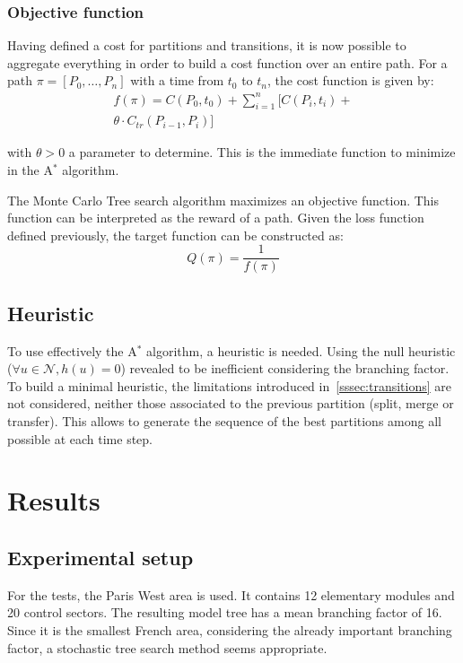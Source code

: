 \documentclass[oneside,twocolumn]{article}
\begin{document}
\subsubsection{Objective function}

Having defined a cost for partitions and transitions, it is now possible to
aggregate everything in order to build a cost function over an entire
path. For a path $\pi = [P_0, \dots, P_n]$ with a time from $t_0$ to $t_n$,
the cost function is given by:
\begin{equation}
  \begin{split}
    f(\pi) = C(P_0, t_0) + \sum_{i = 1}^{n} [C(P_i, t_i) +\\
    \theta \cdot C_{tr}(P_{i-1}, P_i)]
  \end{split}
\end{equation}

with $\theta > 0$ a parameter to determine.
This is the immediate function to minimize in the A$^*$ algorithm.

The Monte Carlo Tree search algorithm maximizes an objective function. This function
can be interpreted as the reward of a path.
Given the loss function defined previously, the target function can be
constructed as:
\begin{equation}
  Q(\pi) = \frac{1}{f(\pi)}
\end{equation}


\subsection{Heuristic}
To use effectively the A\(^*\) algorithm, a heuristic is needed. Using the null
heuristic (\(\forall u \in \mathcal{N}, h(u) = 0\)) revealed to be inefficient
considering the branching factor. To build a minimal heuristic, the limitations
introduced in~\ref{sssec:transitions} are not considered, neither those associated
to the previous partition (split, merge or transfer). This allows to generate
the sequence of the best partitions among all possible at each time step.

\section{Results}

\subsection{Experimental setup}
For the tests, the Paris West area is used. It contains 12 elementary modules
and 20 control sectors. The resulting model tree has a mean branching factor of
16. Since it is the smallest French area, considering the already important
branching factor, a stochastic tree search method seems appropriate.
\end{document}
